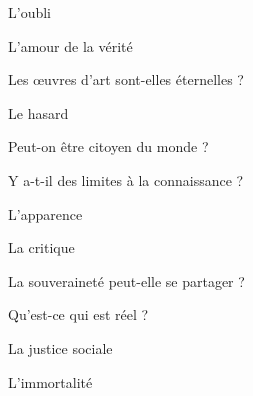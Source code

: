 \documentclass[a4paper,12pt]{article}
\begin{document}
\begin{multicols}{2}
\noindent L’oubli \par
\noindent L’amour de la vérité \par
\noindent Les œuvres d’art sont-elles éternelles ? \par
\noindent Le hasard \par
\noindent Peut-on être citoyen du monde ? \par
\noindent Y a-t-il des limites à la connaissance ? \par
\noindent L’apparence \par
\noindent La critique \par
\noindent La souveraineté peut-elle se partager ? \par
\noindent Qu’est-ce qui est réel ? \par
\noindent La justice sociale \par
\noindent L’immortalité \par
\end{multicols}
\end{document}
